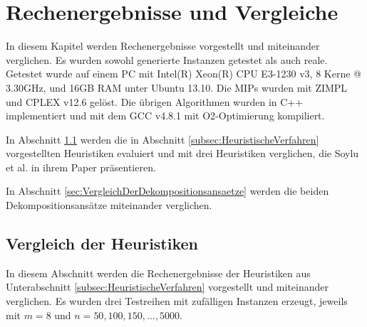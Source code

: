 \documentclass{scrreprt}
\begin{document}
\chapter{Rechenergebnisse und Vergleiche}
\label{chap:RechenergebnisseUndVergleiche}
In diesem Kapitel werden Rechenergebnisse vorgestellt und miteinander verglichen.
Es wurden sowohl generierte Instanzen getestet als auch reale.
Getestet wurde auf einem PC mit Intel(R) Xeon(R) CPU E3-1230 v3, 8 Kerne @ 3.30GHz, und 16GB RAM unter Ubuntu 13.10.
Die MIPs wurden mit ZIMPL \cite{Koch2004} und CPLEX v12.6 gelöst.
Die übrigen Algorithmen wurden in C++ implementiert und mit dem GCC v4.8.1 mit O2-Optimierung kompiliert.

In Abschnitt \ref{subsec:VergleichDerHeuristiken} werden die in Abschnitt \ref{subsec:HeuristischeVerfahren} vorgestellten Heuristiken evaluiert
und mit drei Heuristiken verglichen, die Soylu et al. in ihrem Paper \cite{soylu} präsentieren.

In Abschnitt \ref{sec:VergleichDerDekompositionsansaetze} werden die beiden Dekompositionsansätze miteinander verglichen.


\section{Vergleich der Heuristiken}
\label{subsec:VergleichDerHeuristiken}
In diesem Abschnitt werden die Rechenergebnisse der Heuristiken aus Unterabschnitt \ref{subsec:HeuristischeVerfahren} vorgestellt und miteinander verglichen.
Es wurden drei Testreihen mit zufälligen Instanzen erzeugt, jeweils mit $m=8$ und $n=50,100,150,\ldots,5000$.
\end{document}
